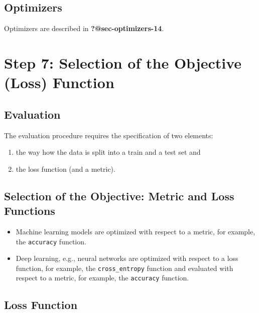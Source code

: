\documentclass[
  letterpaper,
  DIV=11,
  numbers=noendperiod]{scrreprt}
\providecommand{\tightlist}{%
  \setlength{\itemsep}{0pt}\setlength{\parskip}{0pt}}\usepackage{longtable,booktabs,array}
\begin{document}
\hypertarget{sec-optimizers-17}{%
\subsection{Optimizers}\label{sec-optimizers-17}}

Optimizers are described in \textbf{?@sec-optimizers-14}.

\hypertarget{step-7-selection-of-the-objective-loss-function-2}{%
\section{Step 7: Selection of the Objective (Loss)
Function}\label{step-7-selection-of-the-objective-loss-function-2}}

\hypertarget{evaluation}{%
\subsection{Evaluation}\label{evaluation}}

The evaluation procedure requires the specification of two elements:

\begin{enumerate}
\def\labelenumi{\arabic{enumi}.}
\tightlist
\item
  the way how the data is split into a train and a test set and
\item
  the loss function (and a metric).
\end{enumerate}

\hypertarget{selection-of-the-objective-metric-and-loss-functions-1}{%
\subsection{Selection of the Objective: Metric and Loss
Functions}\label{selection-of-the-objective-metric-and-loss-functions-1}}

\begin{itemize}
\tightlist
\item
  Machine learning models are optimized with respect to a metric, for
  example, the \texttt{accuracy} function.
\item
  Deep learning, e.g., neural networks are optimized with respect to a
  loss function, for example, the \texttt{cross\_entropy} function and
  evaluated with respect to a metric, for example, the \texttt{accuracy}
  function.
\end{itemize}

\hypertarget{loss-function}{%
\subsection{Loss Function}\label{loss-function}}
\end{document}

